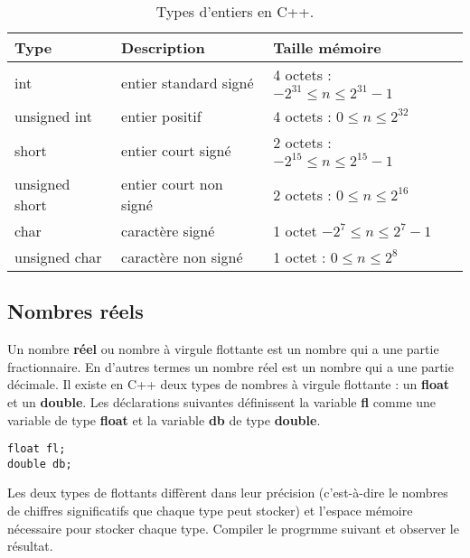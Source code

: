 \documentclass[a4paper, oneside,11pt]{book}
\begin{document}
\begin{table}[hhhh]
\begin{center}
 \begin{tabular}{lll}
 \hline
 \textbf{Type} & \textbf{Description} & \textbf{Taille m\'emoire}\\
  \hline
 int & entier standard sign\'e & 4 octets : $ -2^{31}\leq n \leq 2^{31}-1$\\
 unsigned int & entier positif & 4 octets : $0\leq n \leq 2^{32}$\\
 short & entier court sign\'e & 2 octets : $-2^{15}\leq n \leq 2^{15}-1$\\
 unsigned short & entier court non sign\'e & 2 octets : $0\leq n \leq 2^{16}$\\
 char &caract\`ere  sign\'e & 1 octet  $-2^{7}\leq n \leq 2^{7}-1$\\
 unsigned char & caract\`ere non sign\'e & 1 octet : $0 \leq n \leq 2^{8}$\\
  \hline
 \end{tabular}
 \vspace{-0.25cm}\caption{Types d'entiers en C++.}\label{tab2}
 \end{center}
 \end{table}
 
 
 
 
 


\subsection{Nombres r\'eels}

Un nombre \textbf{r\'eel} ou nombre \`a virgule flottante est un nombre qui a une partie fractionnaire. En d'autres termes un nombre r\'eel est un nombre qui a une partie d\'ecimale.
Il existe  en C++  deux types de nombres \`a virgule flottante : un \textbf{float} et un \textbf{double}. Les d\'eclarations suivantes d\'efinissent la variable \textbf{fl} comme
une variable de type \textbf{float} et la variable \textbf{db} de type \textbf{double}.

\begin{lstlisting}
float fl;
double db;
\end{lstlisting}

Les deux types de flottants diff\`erent dans leur pr\'ecision (c'est-\`a-dire le nombres de chiffres significatifs que chaque type peut stocker) et l'espace m\'emoire n\'ecessaire
pour stocker chaque type. Compiler le progrmme suivant et observer le r\'esultat.
\end{document}
